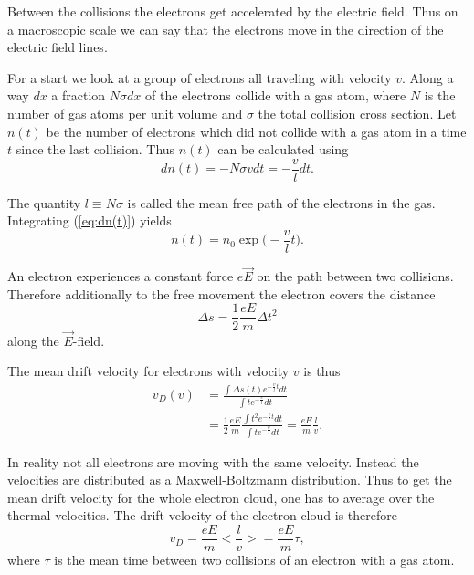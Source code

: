 \documentclass[12pt]{article}
\begin{document}
Between the collisions the electrons get accelerated by the electric field. Thus on a macroscopic scale we can say that the electrons move in the direction of the electric field lines.   

For a start we look at a group of electrons all traveling with velocity $v$. Along a way $dx$ a fraction $N \sigma dx$ of the electrons collide with a gas atom, where $N$ is the number of gas atoms per unit volume and $\sigma$ the total collision cross section. Let $n(t)$ be the number of electrons which did not collide with a gas atom in a time $t$ since the last collision. Thus $n(t)$ can be calculated using
\begin{equation}
dn(t) = - N \sigma v dt = -\frac{v}{l} dt.
\label{eq:dn(t)}
\end{equation}

The quantity $l \equiv N \sigma$ is called the mean free path of the electrons in the gas. Integrating (\ref{eq:dn(t)}) yields
\begin{equation}
n(t) = n_0 \exp\Big(-\frac{v}{l} t \Big).
\end{equation}

An electron experiences a constant force $e \vec{E}$ on the path between two collisions. Therefore additionally to the free movement the electron covers the distance 
\begin{equation}
\Delta s = \frac{1}{2} \frac{eE}{m} \Delta t^2
\end{equation}
along the $\vec{E}$-field.

The mean drift velocity for electrons with velocity $v$ is thus
\begin{align*}
 v_D(v) & = \frac{\int \Delta s(t) e^{-\frac{v}{l} t}dt}{\int t e^{-\frac{v}{l}}dt} \\
 & = \frac{1}{2}\frac{eE}{m} \frac{\int t^2 e^{-\frac{v}{l} t}dt}{\int t e^{-\frac{v}{l}}dt} = \frac{eE}{m} \frac{l}{v}.
\end{align*}

In reality not all electrons are moving with the same velocity. Instead the velocities are distributed as a Maxwell-Boltzmann distribution. Thus to get the mean drift velocity for the whole electron cloud, one has to average over the thermal velocities. The drift velocity of the electron cloud is therefore
\begin{equation} \label{eq:simple_drift}
v_D = \frac{eE}{m} < \frac{l}{v} > = \frac{eE}{m} \tau,
\end{equation}
where $\tau$ is the mean time between two collisions of an electron with a gas atom.
\end{document}
